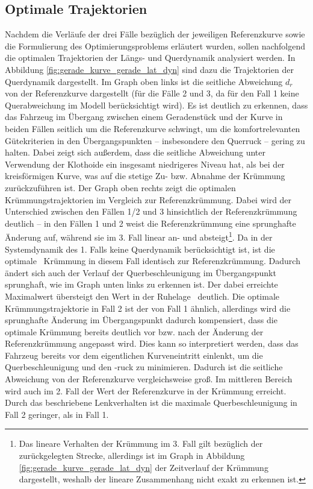 \subsection{Optimale Trajektorien}
Nachdem die Verläufe der drei Fälle bezüglich der jeweiligen Referenzkurve sowie die Formulierung des Optimierungsproblems erläutert wurden, sollen nachfolgend die optimalen Trajektorien der Längs- und Querdynamik analysiert werden. In Abbildung \ref{fig:gerade_kurve_gerade_lat_dyn} sind dazu die Trajektorien der Querdynamik dargestellt. Im Graph oben links ist die seitliche Abweichung $d_r$ von der Referenzkurve dargestellt (für die Fälle 2 und 3, da für den Fall 1 keine Querabweichung im Modell berücksichtigt wird). Es ist deutlich zu erkennen, dass das Fahrzeug im Übergang zwischen einem Geradenstück und der Kurve in beiden Fällen seitlich um die Referenzkurve schwingt, um die komfortrelevanten Gütekriterien in den Übergangspunkten -- insbesondere den Querruck -- gering zu halten. Dabei zeigt sich außerdem, dass die seitliche Abweichung unter Verwendung der Klothoide ein insgesamt niedrigeres Niveau hat, als bei der kreisförmigen Kurve, was auf die stetige Zu- bzw. Abnahme der Krümmung zurückzuführen ist. Der Graph oben rechts zeigt die optimalen Krümmungstrajektorien im Vergleich zur Referenzkrümmung. Dabei wird der Unterschied zwischen den Fällen 1/2 und 3 hinsichtlich der Referenzkrümmung deutlich -- in den Fällen 1 und 2 weist die Referenzkrümmung eine sprunghafte Änderung auf, während sie im 3. Fall linear an- und absteigt\footnote{Das lineare Verhalten der Krümmung im 3. Fall gilt bezüglich der zurückgelegten Strecke, allerdings ist im Graph in Abbildung \ref{fig:gerade_kurve_gerade_lat_dyn} der Zeitverlauf der Krümmung dargestellt, weshalb der lineare Zusammenhang nicht exakt zu erkennen ist.}. Da in der Systemdynamik des 1. Falls keine Querdynamik berücksichtigt ist, ist die \glqq optimale\grqq~ Krümmung in diesem Fall identisch zur Referenzkrümmung. Dadurch ändert sich auch der Verlauf der Querbeschleunigung im Übergangspunkt sprunghaft, wie im Graph unten links zu erkennen ist. Der dabei erreichte Maximalwert übersteigt den Wert in der Ruhelage \ayRL~deutlich. Die optimale Krümmungstrajektorie in Fall 2 ist der von Fall 1 ähnlich, allerdings wird die sprunghafte Änderung im Übergangspunkt dadurch kompensiert, dass die optimale Krümmung bereits deutlich vor bzw. nach der Änderung der Referenzkrümmung angepasst wird. Dies kann so interpretiert werden, dass das Fahrzeug bereits vor dem eigentlichen Kurveneintritt einlenkt, um die Querbeschleunigung und den -ruck zu minimieren. Dadurch ist die seitliche Abweichung von der Referenzkurve vergleichsweise groß. Im mittleren Bereich wird auch im 2. Fall der Wert der Referenzkurve in der Krümmung erreicht. Durch das beschriebene Lenkverhalten ist die maximale Querbeschleunigung in Fall 2 geringer, als in Fall 1.
